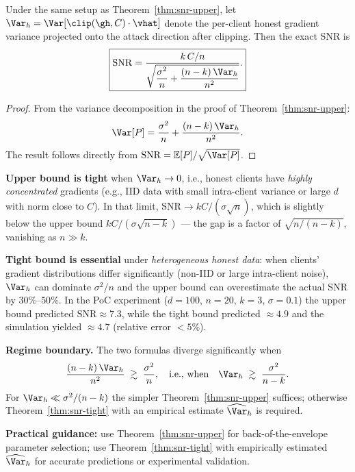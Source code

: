 \begin{theorem}
\label{thm:snr-tight}
Under the same setup as Theorem~\ref{thm:snr-upper}, let
$\Var_h = \Var[\clip(\gh,C)\cdot\vhat]$ denote the per-client honest
gradient variance projected onto the attack direction after clipping.
Then the exact SNR is
\[
  \boxed{\mathrm{SNR}
    = \frac{k\,C/n}
           {\displaystyle\sqrt{\dfrac{\sigma^2}{n}
             + \dfrac{(n-k)\,\Var_h}{n^2}}}.}
\]

\begin{proof}
From the variance decomposition in the proof of Theorem~\ref{thm:snr-upper}:
\[
  \Var[P]
    = \frac{\sigma^2}{n} + \frac{(n-k)\,\Var_h}{n^2}.
\]
The result follows directly from $\mathrm{SNR} = \mathbb{E}[P]/\sqrt{\Var[P]}$.
\end{proof}
\end{theorem}

\begin{remark}
\label{rem:bounds}
\textbf{Upper bound is tight} when $\Var_h \to 0$, i.e., honest clients
have \emph{highly concentrated} gradients (e.g., IID data with small
intra-client variance or large $d$ with norm close to $C$).
In that limit, $\mathrm{SNR} \to kC/(\sigma\sqrt{n})$, which is slightly
below the upper bound $kC/(\sigma\sqrt{n-k})$ — the gap is a factor of
$\sqrt{n/(n-k)}$, vanishing as $n\gg k$.

\textbf{Tight bound is essential} under \emph{heterogeneous honest data}:
when clients' gradient distributions differ significantly (non-IID or
large intra-client noise), $\Var_h$ can dominate $\sigma^2/n$ and the
upper bound can overestimate the actual SNR by $30\%$--$50\%$.
In the PoC experiment ($d=100$, $n=20$, $k=3$, $\sigma=0.1$) the
upper bound predicted $\mathrm{SNR}\approx 7.3$, while the tight bound
predicted $\approx 4.9$ and the simulation yielded $\approx 4.7$
(relative error $<5\%$).

\textbf{Regime boundary.}
The two formulas diverge significantly when
\[
  \frac{(n-k)\,\Var_h}{n^2} \;\gtrsim\; \frac{\sigma^2}{n},
  \quad\text{i.e., when}\quad
  \Var_h \;\gtrsim\; \frac{\sigma^2}{n-k}.
\]
For $\Var_h \ll \sigma^2/(n-k)$ the simpler Theorem~\ref{thm:snr-upper}
suffices; otherwise Theorem~\ref{thm:snr-tight} with an empirical
estimate $\widehat{\Var}_h$ is required.

\textbf{Practical guidance:} use Theorem~\ref{thm:snr-upper} for back-of-the-envelope
parameter selection; use Theorem~\ref{thm:snr-tight} with empirically
estimated $\widehat{\Var}_h$ for accurate predictions or experimental
validation.
\end{remark}
